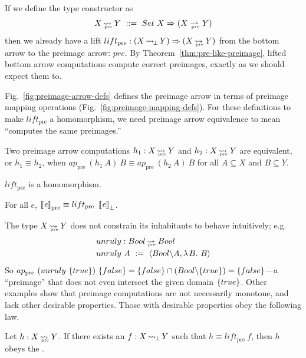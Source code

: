 \documentclass{llncs}
\newcommand{\figref}[1]{Fig.~\ref{#1}}
\newcommand{\arrow}{\rightsquigarrow}
\newcommand{\pto}{\rightharpoonup}
\newcommand{\arrowlift}{\ensuremath{lift}}
\DeclareMathOperator{\botto}{\arrow_{\mspace{-3mu}\bot}}
\newcommand{\pre}{_\mathrm{pre}}
\DeclareMathOperator{\preto}{\arrow_{\mspace{-19mu}\pre}}
\newcommand{\liftpre}{\arrowlift\pre}
\newcommand{\prepto}{\pto_{\mspace{-19mu}\pre}}
\begin{document}
If we define the  type constructor as
\begin{equation}
	X \preto Y \ ::= \ Set~X \tto (X \prepto Y)
\end{equation}
then we already have a lift $\liftpre : (X \botto Y) \tto (X \preto Y)$ from the bottom arrow to the preimage arrow: $pre$.
By Theorem~\ref{thm:pre-like-preimage}, lifted bottom arrow computations compute correct preimages, exactly as we should expect them to.

\figref{fig:preimage-arrow-defs} defines the preimage arrow in terms of preimage mapping operations (\figref{fig:preimage-mapping-defs}).
For these definitions to make $\liftpre$ a homomorphism, we need preimage arrow equivalence to mean ``computes the same preimages.''

\begin{definition}
Two preimage arrow computations $h_1 : X \preto Y$ and $h_2 : X \preto Y$ are equivalent, or $h_1 \equiv h_2$, when 
$ap\pre~(h_1~A)~B \equiv ap\pre~(h_2~A)~B$ for all $A \subseteq X$ and $B \subseteq Y$.
\end{definition}

\begin{theorem}
$\liftpre$ is a homomorphism.
\end{theorem}

\begin{corollary}
\label{cor:preimage-arrow-correctness}
For all $\mathit{e}$, $\meaningof{\mathit{e}}\pre \equiv \liftpre~\meaningof{\mathit{e}}_\bot$.
\end{corollary}

The type $X \preto Y$ does not constrain its inhabitants to behave intuitively; e.g.
\begin{equation}
\begin{aligned}
	&unruly : Bool \preto Bool \\
	&unruly~A \ := \ \pair{Bool \w A, \fun{B} B}
\end{aligned}
\end{equation}
So $ap\pre~(unruly~\set{true})~\set{false} = \set{false} \i (Bool \w \set{true}) = \set{false}$---a ``preimage'' that does not even intersect the given domain $\{{true}\}$.
Other examples show that preimage computations are not necessarily monotone, and lack other desirable properties.
Those with desirable properties obey the following law.

\begin{definition}
\label{def:preimage-arrow-law}
Let $h : X \preto Y$. If there exists an $f : X \botto Y$ such that $h \equiv \liftpre~f$, then $h$ obeys the .
\end{definition}
\end{document}

